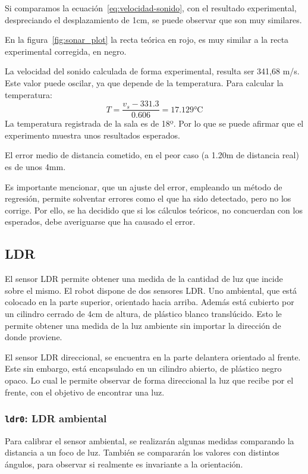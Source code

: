 \documentclass[10pt,a4paper,hidelinks,twocolumn,nobalancelastpage]{article}
\begin{document}
Si comparamos la ecuación~\ref{eq:velocidad-sonido}, con el resultado 
experimental, despreciando el desplazamiento de 1cm, se puede observar que son 
muy similares.

En la figura~\ref{fig:sonar_plot} la recta teórica en rojo, es muy similar a la
recta experimental corregida, en negro.

La velocidad del sonido calculada de forma experimental, resulta ser 341,68 m/s.  
Este valor puede oscilar, ya que depende de la temperatura. Para calcular la 
temperatura:
$$ T = \frac{v_{s}-331.3}{0.606} = 17.129 \si{\celsius} $$
La temperatura registrada de la sala es de 18º. Por lo que se puede afirmar que 
el experimento muestra unos resultados esperados.

El error medio de distancia cometido, en el peor caso (a 1.20m de distancia 
real) es de unos 4mm.

Es importante mencionar, que un ajuste del error, empleando un método de 
regresión, permite solventar errores como el que ha sido detectado, pero no los 
corrige. Por ello, se ha decidido que si los cálculos teóricos, no concuerdan 
con los esperados, debe averiguarse que ha causado el error.
\subsection{LDR}

El sensor LDR permite obtener una medida de la cantidad de luz que incide sobre 
el mismo. El robot dispone de dos sensores LDR. Uno ambiental, que está colocado 
en la parte superior, orientado hacia arriba. Además está cubierto por un 
cilindro cerrado de 4cm de altura, de plástico blanco translúcido. Esto le 
permite obtener una medida de la luz ambiente sin importar la dirección de donde 
proviene.

El sensor LDR direccional, se encuentra en la parte delantera orientado al 
frente. Este sin embargo, está encapsulado en un cilindro abierto, de plástico 
negro opaco. Lo cual le permite observar de forma direccional la luz que recibe 
por el frente, con el objetivo de encontrar una luz.
\subsubsection{\texttt{ldr0}: LDR ambiental}

Para calibrar el sensor ambiental, se realizarán algunas medidas comparando la 
distancia a un foco de luz. También se compararán los valores con distintos 
ángulos, para observar si realmente es invariante a la orientación.
\end{document}
